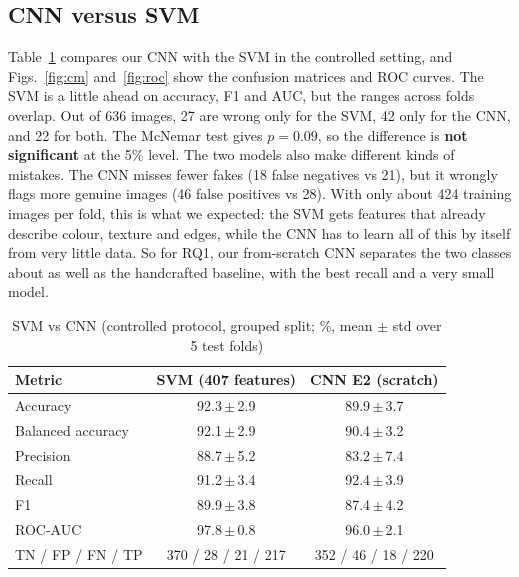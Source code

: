 \documentclass[conference]{IEEEtran}
\newcommand{\pmv}[2]{#1\,$\pm$\,#2}
\begin{document}
\subsection{CNN versus SVM}
Table~\ref{tab:main} compares our CNN with the SVM in the controlled setting, and Figs.~\ref{fig:cm} and~\ref{fig:roc} show the confusion matrices and ROC curves. The SVM is a little ahead on accuracy, F1 and AUC, but the ranges across folds overlap. Out of 636 images, 27 are wrong only for the SVM, 42 only for the CNN, and 22 for both. The McNemar test gives $p=0.09$, so the difference is \textbf{not significant} at the 5\% level. The two models also make different kinds of mistakes. The CNN misses fewer fakes (18 false negatives vs 21), but it wrongly flags more genuine images (46 false positives vs 28). With only about 424 training images per fold, this is what we expected: the SVM gets features that already describe colour, texture and edges, while the CNN has to learn all of this by itself from very little data. So for RQ1, our from-scratch CNN separates the two classes about as well as the handcrafted baseline, with the best recall and a very small model.

\begin{table}[t]
\caption{SVM vs CNN (controlled protocol, grouped split; \%, mean $\pm$ std over 5 test folds)}
\label{tab:main}
\centering
\setlength{\tabcolsep}{4pt}
\begin{tabular}{lcc}
\toprule
Metric & SVM (407 features) & CNN E2 (scratch) \\
\midrule
Accuracy & \pmv{92.3}{2.9} & \pmv{89.9}{3.7} \\
Balanced accuracy & \pmv{92.1}{2.9} & \pmv{90.4}{3.2} \\
Precision & \pmv{88.7}{5.2} & \pmv{83.2}{7.4} \\
Recall & \pmv{91.2}{3.4} & \pmv{92.4}{3.9} \\
F1 & \pmv{89.9}{3.8} & \pmv{87.4}{4.2} \\
ROC-AUC & \pmv{97.8}{0.8} & \pmv{96.0}{2.1} \\
\midrule
TN / FP / FN / TP & 370 / 28 / 21 / 217 & 352 / 46 / 18 / 220 \\
\bottomrule
\end{tabular}
\end{table}
\end{document}
